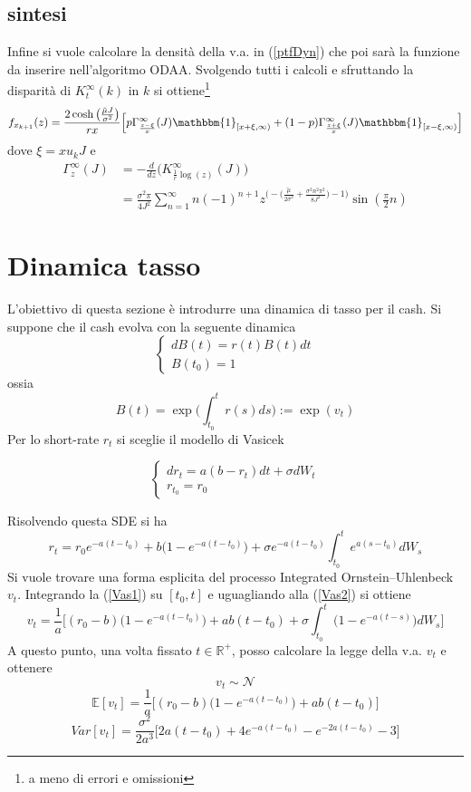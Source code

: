 \documentclass[12pt,a4paper]{article}
\theoremstyle{break}
\begin{document}
\subsection{sintesi}
Infine si vuole calcolare la densità della v.a. in (\ref{ptfDyn}) che poi sarà la funzione da inserire nell'algoritmo ODAA. Svolgendo tutti i calcoli e sfruttando la disparità di $K_t^\infty(k)$ in $k$ si ottiene\footnote{a meno di errori e omissioni}
\begin{equation}
f_{x_{k+1}}(z) = \frac{2\cosh\big(\frac{\tilde{\mu}J}{\sigma^2}\big)}{rx}\Big[p \Gamma^\infty_{\frac{z-\xi}{x}}(J) \mathbbm{1}_{[x+\xi,\infty)} + (1-p)\Gamma^\infty_{\frac{z+\xi}{x}}(J) \mathbbm{1}_{[x-\xi,\infty)}  \Big]
\end{equation}
dove $\xi = x u_k J$ e 
\begin{align*}
\Gamma^\infty_{z}(J) &= -\frac{d}{dz}\Big(K^\infty_{\frac{1}{r}\log(z)}(J)\Big)\\
&=\frac{\sigma^2\pi}{4J^2}\sum_{n=1}^{\infty}n(-1)^{n+1}z^{\Big(-\big(\frac{\tilde{\mu}}{2\sigma^2} + \frac{\sigma^2n^2\pi^2}{8J^2}\big)-1\Big)}\sin(\frac{\pi}{2}n)
\end{align*}
\section{Dinamica tasso}
L'obiettivo di questa sezione è introdurre una dinamica di tasso per il cash. Si suppone che il cash evolva con la seguente dinamica 
\[
\begin{cases}
dB(t) = r(t)B(t)dt \\  
B(t_0) = 1
\end{cases}
\]
ossia \[ B(t) = \exp\Big(\int_{t_0}^{t}r(s)ds\Big) := \exp(v_t)\] Per lo short-rate $r_t$ si sceglie il modello di Vasicek

\begin{equation}\label{Vas1}
\begin{cases}
dr_t = a(b - r_t)dt + \sigma dW_t\\
r_{t_0} = r_0
\end{cases}
\end{equation}

Risolvendo questa SDE si ha
\begin{equation}\label{Vas2}
r_t = r_0e^{-a(t-t_0)} + b \big(1-e^{-a(t-t_0)}\big)+\sigma e^{-a (t-t_0)}\int_{t_0}^{t}e^{a(s-t_0)}dW_s
\end{equation}
Si vuole trovare una forma esplicita del processo Integrated Ornstein–Uhlenbeck $v_t$. Integrando la (\ref{Vas1}) su $[t_0,t]$ e uguagliando alla (\ref{Vas2}) si ottiene 
\begin{equation}
	\boxed{v_t = \frac{1}{a}\Big[(r_0 - b)\big(1-e^{-a(t-t_0)}\big)+ab(t-t_0)+\sigma\int_{t_0}^{t}\big(1-e^{-a(t-s)}\big)dW_s  \Big]}
\end{equation}
A questo punto, una volta fissato $t \in \mathbb{R}^+$, posso calcolare la legge della v.a. $v_t$ e ottenere
\[
v_t \sim \mathcal{N}
\]
\[
\mathbb{E}[v_t] = \frac{1}{a}\Big[(r_0 - b)\big(1-e^{-a(t-t_0)}\big)+ab(t-t_0)\Big]
\]
\[
Var[v_t] = \frac{\sigma^2}{2a^3}\Big[2a(t-t_0) + 4e^{-a(t-t_0)}-e^{-2a(t-t_0)}-3\Big]
\]
\end{document}
